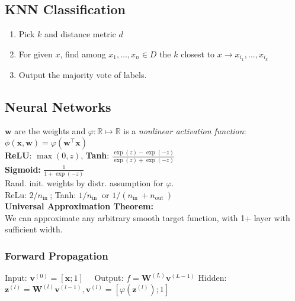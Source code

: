 \documentclass[a4paper,11pt]{article}
\begin{document}
\subsection*{KNN Classification}
\begin{enumerate}
	\item Pick $k$ and distance metric $d$
	\item For given $x$, find among $x_1, \ldots, x_n \in D$ the $k$ closest to $x \rightarrow x_{i_1}, \ldots, x_{i_k}$
	\item Output the majority vote of labels.
\end{enumerate}
\subsection*{Neural Networks}
$\mathbf{w}$ are the weights and $\varphi: \mathbb{R} \mapsto \mathbb{R}$ is a \textit{nonlinear activation function}: $\phi(\mathbf{x}, \mathbf{w})=\varphi\left(\mathbf{w}^{\top} \mathbf{x}\right)$ \\
\textbf{ReLU}: $\max (0, z)$, \textbf{Tanh}: $\frac{\exp (z)-\exp (-z)}{\exp (z)+\exp (-z)}$ \\
\textbf{Sigmoid:} $\frac{1}{1+\exp (-z)}$ \\
Rand. init. weights by distr. assumption for $\varphi$. \\
ReLu: $2 / n_{\text {in }}$; Tanh: $1 / n_{\text {in }}$ or $1 /\left(n_{\text {in }}+n_{\text {out }}\right)$\\
\textbf{Universal Approximation Theorem:}\\
We can approximate any arbitrary smooth target function, with 1+ layer with sufficient width.
\subsubsection*{Forward Propagation}
Input: $\mathbf{v}^{(0)}=[\mathbf{x} ; 1] \quad$ Output: $f=\mathbf{W}^{(L)} \mathbf{v}^{(L-1)}$
Hidden: $\mathbf{z}^{(l)}=\mathbf{W}^{(l)} \mathbf{v}^{(l-1)}, \mathbf{v}^{(l)}=\left[\varphi\left(\mathbf{z}^{(l)}\right) ; 1\right]$
\end{document}

